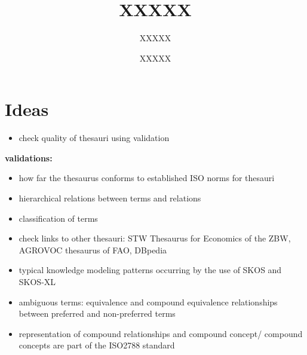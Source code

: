\documentclass{llncs}
\begin{document}
%
%
\title{XXXXX}
%
%
\author{XXXXX \and XXXXX}
%
%

\maketitle              %

\begin{abstract}


\end{abstract}
%


\section{Ideas}

\begin{itemize}
	\item check quality of thesauri using validation
\end{itemize}

\textbf{validations:}
\begin{itemize}
	\item how far the thesaurus conforms to established ISO norms for thesauri
	\item hierarchical relations between terms and relations
	\item classification of terms
	\item check links to other thesauri: STW Thesaurus for Economics of the ZBW, AGROVOC thesaurus of FAO, DBpedia
	\item typical knowledge modeling patterns occurring by the use of SKOS and SKOS-XL
	\item ambiguous terms: equivalence and compound equivalence relationships between preferred and non-preferred terms
	\item representation of compound relationships and compound concept/ compound concepts are part of the ISO2788 standard
\end{itemize}
\end{document}
